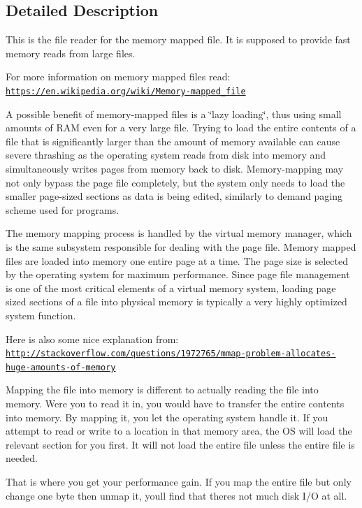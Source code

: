 \subsection{Detailed Description}
This is the file reader for the memory mapped file. It is supposed to provide fast memory reads from large files.

For more information on memory mapped files read\+: \href{https://en.wikipedia.org/wiki/Memory-mapped_file}{\tt https\+://en.\+wikipedia.\+org/wiki/\+Memory-\/mapped\+\_\+file}

A possible benefit of memory-\/mapped files is a \char`\"{}lazy loading\char`\"{}, thus using small amounts of R\+A\+M even for a very large file. Trying to load the entire contents of a file that is significantly larger than the amount of memory available can cause severe thrashing as the operating system reads from disk into memory and simultaneously writes pages from memory back to disk. Memory-\/mapping may not only bypass the page file completely, but the system only needs to load the smaller page-\/sized sections as data is being edited, similarly to demand paging scheme used for programs.

The memory mapping process is handled by the virtual memory manager, which is the same subsystem responsible for dealing with the page file. Memory mapped files are loaded into memory one entire page at a time. The page size is selected by the operating system for maximum performance. Since page file management is one of the most critical elements of a virtual memory system, loading page sized sections of a file into physical memory is typically a very highly optimized system function.

Here is also some nice explanation from\+: \href{http://stackoverflow.com/questions/1972765/mmap-problem-allocates-huge-amounts-of-memory}{\tt http\+://stackoverflow.\+com/questions/1972765/mmap-\/problem-\/allocates-\/huge-\/amounts-\/of-\/memory}

Mapping the file into memory is different to actually reading the file into memory. Were you to read it in, you would have to transfer the entire contents into memory. By mapping it, you let the operating system handle it. If you attempt to read or write to a location in that memory area, the O\+S will load the relevant section for you first. It will not load the entire file unless the entire file is needed.

That is where you get your performance gain. If you map the entire file but only change one byte then unmap it, you\textquotesingle{}ll find that there\textquotesingle{}s not much disk I/\+O at all.

